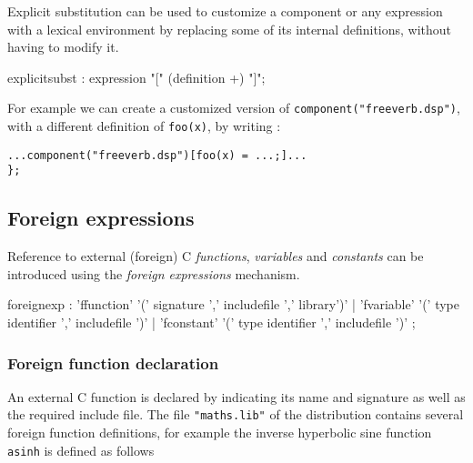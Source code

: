 Explicit substitution can be used to customize a component or any expression with a lexical environment by replacing some of its internal definitions, without having to modify it.


\begin{rail}
explicitsubst : expression "[" (definition +) "]";
\end{rail}

For example we can create a customized version of \lstinline'component("freeverb.dsp")', with a different definition of \lstinline'foo(x)', by writing :
\begin{lstlisting}
...component("freeverb.dsp")[foo(x) = ...;]...
};
\end{lstlisting}

\subsection{Foreign expressions}

Reference to external (foreign) C \textit{functions}, \textit{variables} and \textit{constants} can be introduced using the \textit{foreign expressions} mechanism.
 
\begin{rail}
foreignexp : 'ffunction' '(' signature ',' includefile ',' library')' 
          | 'fvariable' '(' type identifier ',' includefile ')' 
          | 'fconstant' '(' type identifier ',' includefile ')' ;
\end{rail}

\subsubsection{Foreign function declaration} 

An external C function is declared by indicating its name and signature as well as the required include file.
The file \lstinline'"maths.lib"' of the \faust distribution contains several foreign function definitions, for example the inverse hyperbolic sine function \lstinline'asinh' is defined as follows

